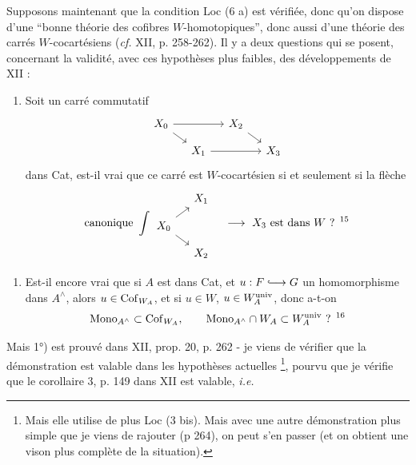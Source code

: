 Supposons maintenant que la condition Loc (6 a) est vérifiée, donc qu'on dispose d'une “bonne théorie des cofibres $W$-homotopiques”, donc aussi d'une théorie des carrés $W$-cocartésiens (\textit{cf.} XII, p. 258-262). Il y a deux questions qui se posent, concernant la validité, avec ces hypothèses plus faibles, des développements de XII :
\begin{enumerate}
\item[1°)] Soit un carré commutatif
\[
\begin{tikzcd}[ampersand replacement=\&, row sep=small, column sep=small]
X_0 \arrow[rr] \arrow[dr] \& \& X_2 \arrow[dr] \& \\
\& X_1 \arrow[rr] \& \& X_3
\end{tikzcd}
\]
dans Cat, est-il vrai que ce carré est $W$-cocartésien si et seulement si la flèche
\[
\text{canonique}\ \displaystyle\int
\begin{tikzcd}[ampersand replacement=\&, row sep=small, column sep=small]
\& X_1 \\
X_0 \arrow[ur] \arrow[dr] \& \\
\& X_2
\end{tikzcd}
\quad \longrightarrow \ X_3 \text{ est dans } W \text{ ? }\text{\footnotemark[15]}
\]
\end{enumerate}
\begin{enumerate}
\item[2°)] Est-il encore vrai que si $A$ est dans Cat, et $u : F \lhook\joinrel\longrightarrow G$ un homomorphisme dans $A^{\wedge}$, alors $u \in \mathrm{Cof}_{W_A}$, et si $u \in W$, $u \in W_A^{\mathrm{univ}}$, donc a-t-on
\[
\Mono_{A^{\wedge}} \subset \Cof_{W_A}, \qquad \Mono_{A^{\wedge}} \cap W_A \subset W_A^{\univ} \text{ ? }\text{\footnotemark[16]}
\]
\end{enumerate}
Mais 1°) est prouvé dans XII, prop. 20, p. 262 - je viens de vérifier que la démonstration est valable dans les hypothèses actuelles \footnote[17]{Mais elle utilise de plus Loc (3 bis). Mais avec une autre démonstration plus simple que je viens de rajouter (p 264), on peut s'en passer (et on obtient une vison plus complète de la situation).}, pourvu que je vérifie que le corollaire 3, p. 149 dans XII est valable, \textit{i.e.} %
